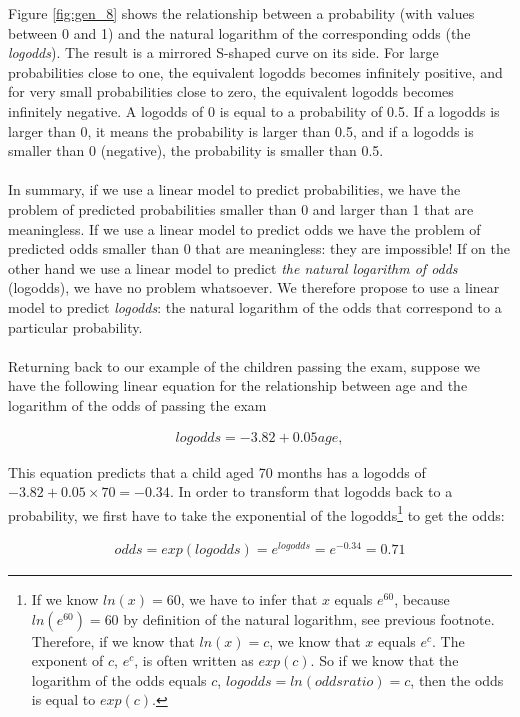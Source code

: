 \documentclass[]{book}\usepackage[]{graphicx}\usepackage[]{color}
\begin{document}
Figure \ref{fig:gen_8} shows the relationship between a probability (with values between 0 and 1) and the natural logarithm of the corresponding odds (the \textit{logodds}). The result is a mirrored S-shaped curve on its side. For large probabilities close to one, the equivalent logodds becomes infinitely positive, and for very small probabilities close to zero, the equivalent logodds becomes infinitely negative. A logodds of 0 is equal to a probability of 0.5. If a logodds is larger than 0, it means the probability is larger than 0.5, and if a logodds is smaller than 0 (negative), the probability is smaller than 0.5.
\\
\\
In summary, if we use a linear model to predict probabilities, we have the problem of predicted probabilities smaller than 0 and larger than 1 that are meaningless. If we use a linear model to predict odds we have the problem of predicted odds smaller than 0 that are meaningless: they are impossible! If on the other hand we use a linear model to predict \textit{the natural logarithm of odds} (logodds), we have no problem whatsoever. We therefore propose to use a linear model to predict \textit{logodds}: the natural logarithm of the odds that correspond to a particular probability.
\\
\\
Returning back to our example of the children passing the exam, suppose we have the following linear equation for the relationship between age and the logarithm of the odds of passing the exam


\begin{eqnarray}
logodds=-3.82 + 0.05 age, \nonumber
\end{eqnarray}


This equation predicts that a child aged 70 months has a logodds of $-3.82 + 0.05 \times 70 =-0.34$. In order to transform that logodds back to a probability, we first have to take the exponential of the logodds\footnote{If we know $ln(x)=60$, we have to infer that $x$ equals $e^{60}$, because $ln(e^{60})=60$ by definition of the natural logarithm, see previous footnote. Therefore, if we know that $ln(x)=c$, we know that $x$ equals $e^c$. The exponent of $c$, $e^c$, is often written as $exp(c)$. So if we know that the logarithm of the odds equals $c$, $logodds=ln(oddsratio)=c$, then the odds is equal to $exp(c)$.} to get the odds:


\begin{eqnarray}
odds = exp(logodds)= e^{logodds}=e^{-0.34}=0.71 \nonumber
\end{eqnarray}
\end{document}
